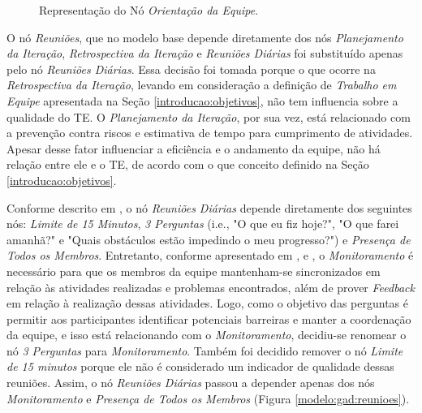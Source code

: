 \begin{figure}[ht!]
\begin{center}
	\end{center}
	\caption{Representação do Nó \textit{Orientação da Equipe}.}
	\label{modelo:gad:orientacao}
\end{figure}

O nó \textit{Reuniões}, que no modelo base depende diretamente dos nós \textit{Planejamento da Iteração}, \textit{Retrospectiva da Iteração} e \textit{Reuniões Diárias} foi substituído apenas pelo nó \textit{Reuniões Diárias}. Essa decisão foi tomada porque o que ocorre na \textit{Retrospectiva da Iteração}, levando em consideração a definição de \textit{Trabalho em Equipe} apresentada na Seção \ref{introducao:objetivos}, não tem influencia sobre a qualidade do TE. O \textit{Planejamento da Iteração}, por sua vez, está relacionado com a prevenção contra riscos e estimativa de tempo para cumprimento de atividades. Apesar desse fator influenciar a eficiência e o andamento da equipe, não há relação entre ele e o TE, de acordo com o que conceito definido na Seção \ref{introducao:objetivos}.

Conforme descrito em \cite{freire}, o nó \textit{Reuniões Diárias} depende diretamente dos seguintes nós: \textit{Limite de 15 Minutos}, \textit{3 Perguntas} (i.e., "O que eu fiz hoje?", "O que farei amanhã?" e "Quais obstáculos estão impedindo o meu progresso?") e \textit{Presença de Todos os Membros}. Entretanto, conforme apresentado em \cite{moe2}, \cite{gurram} e \cite{haraldsen}, o \textit{Monitoramento} é necessário para que os membros da equipe mantenham-se sincronizados em relação às atividades realizadas e problemas encontrados, além de prover \textit{Feedback} em relação à realização dessas atividades. Logo, como o objetivo das perguntas é permitir aos participantes identificar potenciais barreiras e manter a coordenação da equipe, e isso está relacionando com o \textit{Monitoramento}, decidiu-se renomear o nó \textit{3 Perguntas} para \textit{Monitoramento}. Também foi decidido remover o nó \textit{Limite de 15 minutos} porque ele não é considerado um indicador de qualidade dessas reuniões. Assim, o nó \textit{Reuniões Diárias} passou a depender apenas dos nós \textit{Monitoramento} e \textit{Presença de Todos os Membros} (Figura \ref{modelo:gad:reunioes}).

